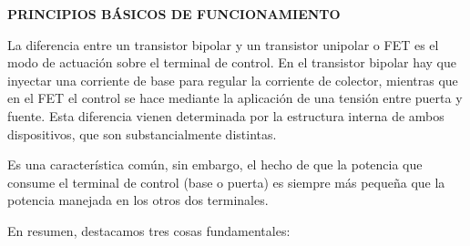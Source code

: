 \documentclass[12pt]{article}
\begin{document}
\vspace{\baselineskip}
\textbf{PRINCIPIOS BÁSICOS DE FUNCIONAMIENTO}\par

La diferencia entre un transistor bipolar y un transistor unipolar o FET es el modo de actuación sobre el terminal de control. En el transistor bipolar hay que inyectar una corriente de base para regular la corriente de colector, mientras que en el FET el control se hace mediante la aplicación de una tensión entre puerta y fuente. Esta diferencia vienen determinada por la estructura interna de ambos dispositivos, que son substancialmente distintas. \par

Es una característica común, sin embargo, el hecho de que la potencia que consume el terminal de control (base o puerta) es siempre más pequeña que la potencia manejada en los otros dos terminales. \par

En resumen, destacamos tres cosas fundamentales: \par
\end{document}
